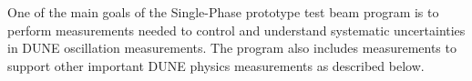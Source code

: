 \label{detbeamtest}
One of the main goals of the Single-Phase prototype test beam program is to perform measurements 
needed to control and understand systematic uncertainties in DUNE oscillation measurements.
The program also includes measurements to support other important DUNE physics measurements as described below.
%



